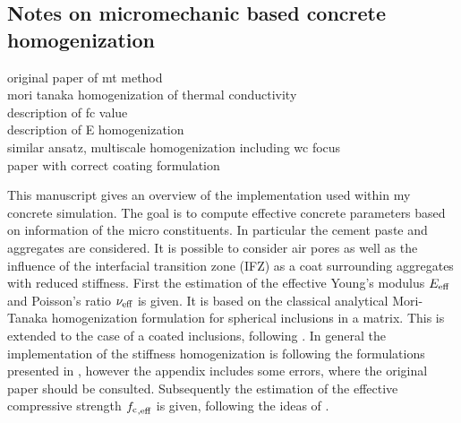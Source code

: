 \subsection{Notes on micromechanic based concrete homogenization}

\cite{mor_1973_asi} original paper of mt method\\
\cite{str_2011_mbeo} mori tanaka homogenization of thermal conductivity\\
\cite{nev_2018_mcam} description of fc value\\
\cite{nee_2012_ammf} description of E homogenization\\
\cite{pic_2011_uqso} similar ansatz, multiscale homogenization including wc focus\\
\cite{her_1993_nlib} paper with correct coating formulation




This manuscript gives an overview of the implementation used within my concrete simulation.
The goal is to compute effective concrete parameters based on information of the micro constituents.
In particular the cement paste and aggregates are considered.
It is possible to consider air pores as well as the influence of the interfacial transition zone (IFZ) as a coat surrounding aggregates with reduced stiffness. 
First the estimation of the effective Young's modulus $E_{\text{eff}}$ and Poisson's ratio $\nu_{\text{eff}}$ is given.
It is based on the classical analytical Mori-Tanaka homogenization formulation \cite{mor_1973_asi} for spherical inclusions in a matrix.
This is extended to the case of a coated inclusions, following \cite{her_1993_nlib}.
In general the implementation of the stiffness homogenization is following the formulations presented in \cite{nee_2012_ammf}, however the appendix includes some errors, where the original paper \cite{her_1993_nlib} should be consulted.
Subsequently the estimation of the effective compressive strength ${f_{\text{c}}}_{,\text{eff}}$ is given, following the ideas of \cite{nev_2018_mcam}.

